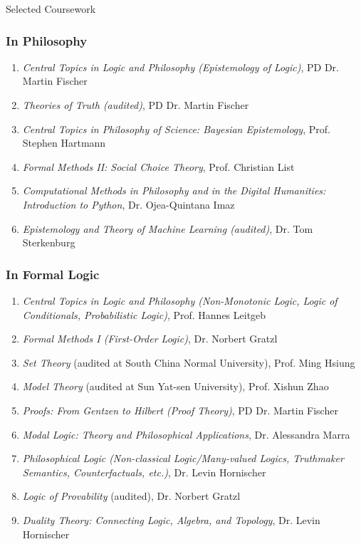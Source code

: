\documentclass{resume}
\begin{document}
\newpage
\begin{rSection}{Selected Coursework}
\subsubsection*{In Philosophy}
\begin{enumerate}
\item \textit{Central Topics in Logic and Philosophy (Epistemology of Logic)}, PD Dr. Martin Fischer
\item \textit{Theories of Truth (audited)}, PD Dr. Martin Fischer
\item \textit{Central Topics in Philosophy of Science: Bayesian Epistemology}, Prof. Stephen Hartmann
\item \textit{Formal Methods II: Social Choice Theory}, Prof. Christian List
\item \textit{Computational Methods in Philosophy and in the Digital Humanities: Introduction to Python}, Dr. Ojea-Quintana Imaz
\item \textit{Epistemology and Theory of Machine Learning (audited)}, Dr. Tom Sterkenburg
\end{enumerate}
\subsubsection*{In Formal Logic}
\begin{enumerate}
\item \textit{Central Topics in Logic and Philosophy (Non-Monotonic Logic, Logic of Conditionals, Probabilistic Logic)}, Prof. Hannes Leitgeb
\item \textit{Formal Methods I (First-Order Logic)}, Dr. Norbert Gratzl
\item \textit{Set Theory} (audited at South China Normal University), Prof. Ming Hsiung
\item \textit{Model Theory} (audited at Sun Yat-sen University), Prof. Xishun Zhao
\item \textit{Proofs: From Gentzen to Hilbert (Proof Theory)}, PD Dr. Martin Fischer
\item \textit{Modal Logic: Theory and Philosophical Applications}, Dr. Alessandra Marra
\item \textit{Philosophical Logic (Non-classical Logic/Many-valued Logics, Truthmaker Semantics, Counterfactuals, etc.)}, Dr. Levin Hornischer
\item \textit{Logic of Provability} (audited), Dr. Norbert Gratzl
\item \textit{Duality Theory: Connecting Logic, Algebra, and Topology}, Dr. Levin Hornischer
\end{enumerate}
\end{rSection}
\end{document}
